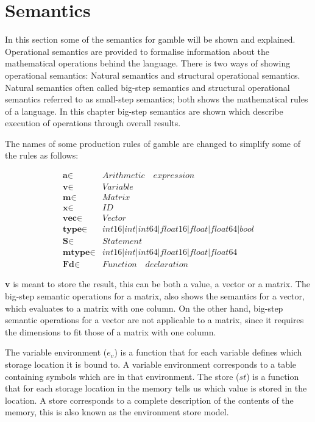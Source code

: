 \chapter{Semantics}\label{cha:semantics}
In this section some of the semantics for \gls{gamble} will be shown and explained.
Operational semantics are provided to formalise information about the mathematical operations behind the language.
There is two ways of showing operational semantics: Natural semantics and structural operational semantics.
Natural semantics often called big-step semantics and structural operational semantics referred to as small-step semantics; both shows the mathematical rules of a language. 
In this chapter big-step semantics are shown which describe execution of operations through overall results.

The names of some production rules of \gls{gamble} are changed to simplify some of the rules as follows:

\begin{align*}
	\textbf{a} \in  &Arithmetic\quad expression\\
	\textbf{v} \in  &Variable\\
	\textbf{m} \in  &Matrix\\
	\textbf{x} \in &ID\\
	\textbf{vec} \in  &Vector\\
	\textbf{type} \in &int16 | int | int64 | float16 | float | float64 | bool\\
	\textbf{S}	\in &Statement\\
	\textbf{mtype} \in &int16 | int | int64 | float16 | float | float64\\
	\textbf{Fd}		\in &Function\quad  declaration
\end{align*}

\textbf{v} is meant to store the result, this can be both a value, a vector or a matrix.
The big-step semantic operations for a matrix, also shows the semantics for a vector, which evaluates to a matrix with one column.
On the other hand, big-step semantic operations for a vector are not applicable to a matrix, since it requires the dimensions to fit those of a matrix with one column.

The variable environment (${ e }_{ v }$) is a function that for each variable defines which storage location it is bound to. A variable environment corresponds to a table containing symbols which are in that environment.
The store ($st$) is a function that for each storage location in the memory tells us which value is stored in the location. A store corresponds to a complete description of the contents of the memory, this is also known as the environment store model. \citep{EnvSt_Semantics}

